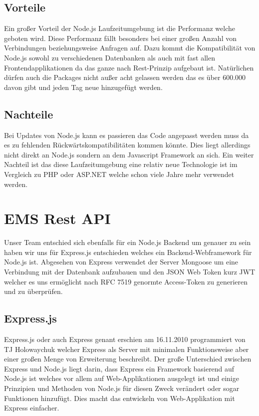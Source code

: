 		 	\subsection{Vorteile}
		 		Ein großer Vorteil der Node.js Laufzeitumgebung ist die Performanz welche geboten wird. Diese Performanz fällt besonders bei einer großen Anzahl von Verbindungen beziehungsweise Anfragen auf. Dazu kommt die Kompatibilität von Node.js sowohl zu verschiedenen Datenbanken als auch mit fast allen Frontendapplikationen da das ganze nach Rest-Prinzip aufgebaut ist. Natürlichen dürfen auch die Packages nicht außer acht gelassen werden das es über 600.000 davon gibt und jeden Tag neue hinzugefügt werden.
		 		
		 	\subsection{Nachteile}
		 		Bei Updates von Node.js kann es passieren das Code angepasst werden muss da es zu fehlenden Rückwärtskompatibilitäten kommen könnte. Dies liegt allerdings nicht direkt an Node.js sondern an dem Javascript Framework an sich. Ein weiter Nachteil ist das diese Laufzeitumgebung eine relativ neue Technologie ist im Vergleich zu PHP oder ASP.NET welche schon viele Jahre mehr verwendet werden. 
		 		
		 \section{EMS Rest API}
		 	Unser Team entschied sich ebenfalls für ein Node.js Backend um genauer zu sein haben wir uns für Express.js entschieden welches ein Backend-Webframework für Node.js ist. Abgesehen von Express verwendet der Server Mongoose um eine Verbindung mit der Datenbank aufzubauen und den JSON Web Token kurz JWT welcher es uns ermöglicht nach RFC 7519 genormte Access-Token zu generieren und zu überprüfen. 
		 	
		 	\subsection{Express.js}
		 	 	Express.js oder auch Express genant erschien am 16.11.2010 programmiert von TJ Holowaychuk welcher Express als Server mit minimalen Funktionsweise aber einer großen Menge von Erweiterung beschreibt. Der große Unterschied zwischen Express und Node.js liegt darin, dass Express ein Framework basierend auf Node.js ist welches vor allem auf Web-Applikationen ausgelegt ist und einige Prinzipien und Methoden von Node.js für diesen Zweck verändert oder sogar Funktionen hinzufügt. Dies macht das entwickeln von Web-Applikation mit Express einfacher.
		 	
